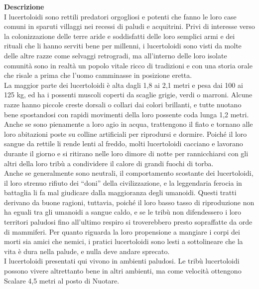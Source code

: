 \begin{multicols}{2}
\textbf{Descrizione}\\
I lucertoloidi sono rettili predatori orgogliosi e potenti che fanno le loro case comuni in sparuti villaggi nei recessi di paludi e acquitrini. Privi di interesse verso la colonizzazione delle terre aride e soddisfatti delle loro semplici armi e dei rituali che li hanno serviti bene per millenni, i lucertoloidi sono visti da molte delle altre razze come selvaggi retrogradi, ma all'interno delle loro isolate comunità sono in realtà un popolo vitale ricco di tradizioni e con una storia orale che risale a prima che l’uomo camminasse in posizione eretta.\\

La maggior parte dei lucertoloidi è alta dagli 1,8 ai 2,1 metri e pesa dai 100 ai 125 kg, ed ha i possenti muscoli coperti da scaglie grigie, verdi o marroni. Alcune razze hanno piccole creste dorsali o collari dai colori brillanti, e tutte nuotano bene spostandosi con rapidi movimenti della loro possente coda lunga 1,2 metri. Anche se sono pienamente a loro agio in acqua, trattengono il fiato e tornano alle loro abitazioni poste su colline artificiali per riprodursi e dormire. Poiché il loro sangue da rettile li rende lenti al freddo, molti lucertoloidi cacciano e lavorano durante il giorno e si ritirano nelle loro dimore di notte per rannicchiarsi con gli altri della loro tribù a condividere il calore di grandi fuochi di torba.\\

Anche se generalmente sono neutrali, il comportamento scostante dei lucertoloidi, il loro strenuo rifiuto dei “doni” della civilizzazione, e la leggendaria ferocia in battaglia li fa mal giudicare dalla maggioranza degli umanoidi. Questi tratti derivano da buone ragioni, tuttavia, poiché il loro basso tasso di riproduzione non ha eguali tra gli umanoidi a sangue caldo, e se le tribù non difendessero i loro territori paludosi fino all'ultimo respiro si troverebbero presto sopraffatte da orde di mammiferi. Per quanto riguarda la loro propensione a mangiare i corpi dei morti sia amici che nemici, i pratici lucertoloidi sono lesti a sottolineare che la vita è dura nella palude, e nulla deve andare sprecato.\\

I lucertoloidi presentati qui vivono in ambienti paludosi. Le tribù lucertoloidi possono vivere altrettanto bene in altri ambienti, ma come velocità ottengono Scalare 4,5 metri al posto di Nuotare.\\



\end{multicols}
